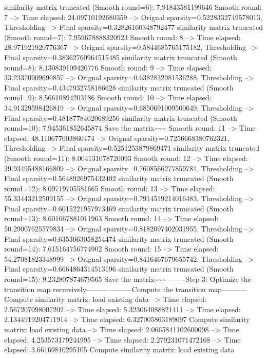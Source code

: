 \documentclass[letterpaper,10pt,english]{sphinxmanual}
\begin{document}
{\begin{sphinxVerbatim}[commandchars=\\\{\}]
similarity matrix truncated (Smooth round=6):  7.91843581199646
Smooth round: 7
--> Time elapsed: 24.09710192680359
--> Orignal sparsity=0.5228332749578013, Thresholding
--> Final sparsity=0.32826160348792477
similarity matrix truncated (Smooth round=7):  7.959678888320923
Smooth round: 8
--> Time elapsed: 28.971921920776367
--> Orignal sparsity=0.5844685765175182, Thresholding
--> Final sparsity=0.38362760964515485
similarity matrix truncated (Smooth round=8):  8.130839109420776
Smooth round: 9
--> Time elapsed: 33.23370909690857
--> Orignal sparsity=0.6382832981536288, Thresholding
--> Final sparsity=0.4347932758186628
similarity matrix truncated (Smooth round=9):  8.56610894203186
Smooth round: 10
--> Time elapsed: 34.91329598426819
--> Orignal sparsity=0.6850691009500649, Thresholding
--> Final sparsity=0.48187784020689256
similarity matrix truncated (Smooth round=10):  7.945361852645874
Save the matrix\textasciitilde{}\textasciitilde{}\textasciitilde{}
Smooth round: 11
--> Time elapsed: 48.110677003860474
--> Orignal sparsity=0.7256668380762321, Thresholding
--> Final sparsity=0.5251253879869471
similarity matrix truncated (Smooth round=11):  8.004131078720093
Smooth round: 12
--> Time elapsed: 39.93495488166809
--> Orignal sparsity=0.7608566277859781, Thresholding
--> Final sparsity=0.5648926975432402
similarity matrix truncated (Smooth round=12):  8.09719705581665
Smooth round: 13
--> Time elapsed: 55.33443212509155
--> Orignal sparsity=0.7914519214016483, Thresholding
--> Final sparsity=0.6015221957973469
similarity matrix truncated (Smooth round=13):  8.601667881011963
Smooth round: 14
--> Time elapsed: 50.29007625579834
--> Orignal sparsity=0.8182097402031955, Thresholding
--> Final sparsity=0.6353063058254474
similarity matrix truncated (Smooth round=14):  7.615164756774902
Smooth round: 15
--> Time elapsed: 54.27081823348999
--> Orignal sparsity=0.8416467679655742, Thresholding
--> Final sparsity=0.6664864314513196
similarity matrix truncated (Smooth round=15):  9.232807874679565
Save the matrix\textasciitilde{}\textasciitilde{}\textasciitilde{}
-------Step 3: Optimize the transition map recursively---------
---------Compute the transition map-----------
Compute similarity matrix: load existing data
--> Time elapsed:  2.567207098007202
--> Time elapsed:  5.323064088821411
--> Time elapsed:  2.1344919204711914
--> Time elapsed:  6.327005863189697
Compute similarity matrix: load existing data
--> Time elapsed:  2.0665841102600098
--> Time elapsed:  4.253573179244995
--> Time elapsed:  2.279231071472168
--> Time elapsed:  3.66169810295105
Compute similarity matrix: load existing data

\end{sphinxVerbatim}}
\end{document}
